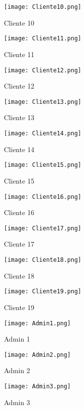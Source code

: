 \documentclass[12pt,a4paper, twosite]{article}
\begin{document}
\begin{figure}[h]
  \centering
  \texttt{[image: Cliente10.png]}
  \caption{Cliente 10}
\end{figure}
\begin{figure}[h]
  \centering
  \texttt{[image: Cliente11.png]}
  \caption{Cliente 11}
\end{figure}
\begin{figure}[h]
  \centering
  \texttt{[image: Cliente12.png]}
  \caption{Cliente 12}
\end{figure}
\begin{figure}[h]
  \centering
  \texttt{[image: Cliente13.png]}
  \caption{Cliente 13}
\end{figure}
\begin{figure}[h]
  \centering
  \texttt{[image: Cliente14.png]}
  \caption{Cliente 14}
\end{figure}
\begin{figure}[h]
  \centering
  \texttt{[image: Cliente15.png]}
  \caption{Cliente 15}
\end{figure}
\begin{figure}[h]
  \centering
  \texttt{[image: Cliente16.png]}
  \caption{Cliente 16}
\end{figure}
\begin{figure}[h]
  \centering
  \texttt{[image: Cliente17.png]}
  \caption{Cliente 17}
\end{figure}
\begin{figure}[h]
  \centering
  \texttt{[image: Cliente18.png]}
  \caption{Cliente 18}
\end{figure}
\begin{figure}[h]
  \centering
  \texttt{[image: Cliente19.png]}
  \caption{Cliente 19}
\end{figure}
\begin{figure}[h]
  \centering
  \texttt{[image: Admin1.png]}
  \caption{Admin 1}
\end{figure}
\begin{figure}[h]
  \centering
  \texttt{[image: Admin2.png]}
  \caption{Admin 2}
\end{figure}
\begin{figure}[h]
  \centering
  \texttt{[image: Admin3.png]}
  \caption{Admin 3}
\end{figure}
\end{document}
